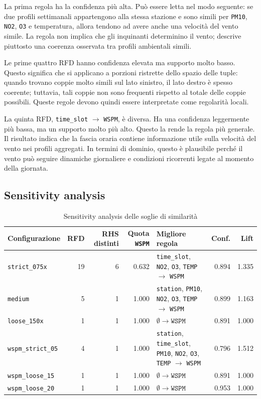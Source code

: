\documentclass[a4paper,12pt]{article}
\newcommand{\PMdieci}{\texttt{PM10}}
\newcommand{\NOdue}{\texttt{NO2}}
\newcommand{\Otre}{\texttt{O3}}
\newcommand{\Temp}{\texttt{TEMP}}
\newcommand{\Wspm}{\texttt{WSPM}}
\newcommand{\Station}{\texttt{station}}
\newcommand{\TimeSlot}{\texttt{time\_slot}}
\begin{document}
La prima regola ha la confidenza più alta. Può essere letta nel modo seguente: se due profili settimanali appartengono alla stessa stazione e sono simili per \PMdieci, \NOdue, \Otre{} e temperatura, allora tendono ad avere anche una velocità del vento simile. La regola non implica che gli inquinanti determinino il vento; descrive piuttosto una coerenza osservata tra profili ambientali simili.

Le prime quattro RFD hanno confidenza elevata ma supporto molto basso. Questo significa che si applicano a porzioni ristrette dello spazio delle tuple: quando trovano coppie molto simili sul lato sinistro, il lato destro è spesso coerente; tuttavia, tali coppie non sono frequenti rispetto al totale delle coppie possibili. Queste regole devono quindi essere interpretate come regolarità locali.

La quinta RFD, \TimeSlot{} $\rightarrow$ \Wspm, è diversa. Ha una confidenza leggermente più bassa, ma un supporto molto più alto. Questo la rende la regola più generale. Il risultato indica che la fascia oraria contiene informazione utile sulla velocità del vento nei profili aggregati. In termini di dominio, questo è plausibile perché il vento può seguire dinamiche giornaliere e condizioni ricorrenti legate al momento della giornata.

\subsection{Sensitivity analysis}

\begin{table}[H]
\centering
\caption{Sensitivity analysis delle soglie di similarità}
\label{tab:sensitivity}
\scriptsize
\setlength{\tabcolsep}{3pt}
\begin{tabularx}{\textwidth}{@{}>{\raggedright\arraybackslash}p{2.1cm} r r r >{\raggedright\arraybackslash}X r r@{}}
\toprule
Configurazione & RFD & RHS distinti & Quota \Wspm{} & Migliore regola & Conf. & Lift \\
\midrule
\texttt{strict\_075x} & 19 & 6 & 0.632 &
\TimeSlot, \NOdue, \Otre, \Temp{} $\rightarrow$ \Wspm{} & 0.894 & 1.335 \\
\texttt{medium} & 5 & 1 & 1.000 &
\Station, \PMdieci, \NOdue, \Otre, \Temp{} $\rightarrow$ \Wspm{} & 0.899 & 1.163 \\
\texttt{loose\_150x} & 1 & 1 & 1.000 &
$\emptyset \rightarrow \texttt{WSPM}$ & 0.891 & 1.000 \\
\texttt{wspm\_strict\_05} & 4 & 1 & 1.000 &
\Station, \TimeSlot, \PMdieci, \NOdue, \Otre, \Temp{} $\rightarrow$ \Wspm{} & 0.796 & 1.512 \\
\texttt{wspm\_loose\_15} & 1 & 1 & 1.000 &
$\emptyset \rightarrow \texttt{WSPM}$ & 0.891 & 1.000 \\
\texttt{wspm\_loose\_20} & 1 & 1 & 1.000 &
$\emptyset \rightarrow \texttt{WSPM}$ & 0.953 & 1.000 \\
\bottomrule
\end{tabularx}
\end{table}
\end{document}
